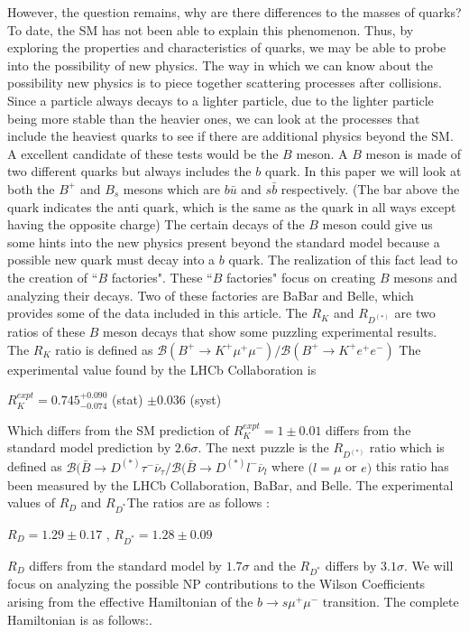 \documentclass[12pt]{article}
\def \onu{\overline{\nu}}
\def \si{\sigma}
\begin{document}
However, the question remains, why are there differences to the masses of quarks? To date, the SM has not been able to explain this phenomenon. Thus, by exploring the properties and characteristics of quarks, we may be able to probe into the possibility of new physics. The way in which we can know about the possibility new physics is to piece together scattering processes after collisions. Since a particle always decays to a lighter particle, due to the lighter particle being more stable than the heavier ones, we can look at the processes that include the heaviest quarks to see if there are additional physics beyond the SM. A excellent candidate of these tests would be the $B$ meson. A $B$ meson is made of two different quarks but always includes the $b$ quark. In this paper we will look at both the $B^+$ and $B_s$ mesons which are $b\bar{u}$ and $s\bar{b}$ respectively. \cite{Griffiths} (The bar above the quark indicates the anti quark, which is the same as the quark in all ways except having the opposite charge) The certain decays of the $B$ meson could give us some hints into the new physics present beyond the standard model because a possible new quark must decay into a $b$ quark. The realization of this fact lead to the creation of ``$B$ factories". These ``$B$ factories" focus on creating $B$ mesons and analyzing their decays. Two of these factories are BaBar and Belle, which provides some of the data included in this article. The $R_K$ and $R_{D^{(*)}}$ are two ratios of these $B$ meson decays that show some puzzling experimental results. The $R_K$ ratio is defined as $\mathcal{B}(B^+\rightarrow K^+\mu^+\mu^-)/ \mathcal{B}(B^+\rightarrow K^+e^+e^-)$ The experimental value found by the LHCb Collaboration is \cite{Aaij:2014ora}
\begin{center}
$R^{expt}_{K} = 0.745 _{\num{-0.074}}^{+0.090}$ (stat) $\pm 0.036$ (syst)
\end{center}
Which differs from the SM prediction of $R^{expt}_{K} = 1 \pm 0.01$ differs from the standard model prediction by $2.6\si$. \cite{Bordone:2016gaq} The next puzzle is the $R_{D^{(*)}}$ ratio which is defined as $\mathcal{B}(\bar{B} \rightarrow D^{(*)}\tau^- \onu_{\tau}/ \mathcal{B}(\bar{B} \rightarrow D^{(*)}l^- \onu_{l}$ where $(l= \mu$ or $e)$ this ratio has been measured by the LHCb  Collaboration, BaBar, and Belle. The experimental values of $R_D$ and $R_{D^*}$The ratios are as follows \cite{Lees:2013uzd, Huschle:2015rga, Aaij:2015yra} :
\begin{center}
$R_D= 1.29 \pm 0.17$ , $R_{D^*} = 1.28 \pm 0.09$
\end{center}$R_D$ differs from the standard model by $1.7\si$ and the $R_{D^*}$ differs by $3.1\si$. We will focus on analyzing the possible NP contributions to the Wilson Coefficients arising from the effective Hamiltonian of the $b \rightarrow s\mu^+\mu^-$ transition. The complete Hamiltonian is as follows:\cite{Bhattacharya:2016mcc}. 
\end{document}

